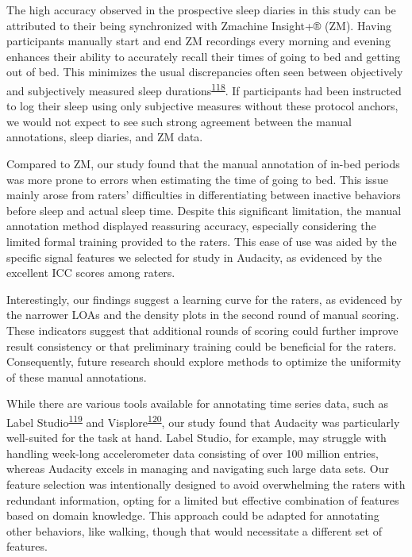 \documentclass[
  10pt,
]{scrbook}
\begin{document}
The high accuracy observed in the prospective sleep diaries in this
study can be attributed to their being synchronized with Zmachine
Insight+® (ZM). Having participants manually start and end ZM recordings
every morning and evening enhances their ability to accurately recall
their times of going to bed and getting out of bed. This minimizes the
usual discrepancies often seen between objectively and subjectively
measured sleep
durations\textsuperscript{\protect\hyperlink{ref-aili_reliability_2017}{118}}.
If participants had been instructed to log their sleep using only
subjective measures without these protocol anchors, we would not expect
to see such strong agreement between the manual annotations, sleep
diaries, and ZM data.

Compared to ZM, our study found that the manual annotation of in-bed
periods was more prone to errors when estimating the time of going to
bed. This issue mainly arose from raters' difficulties in
differentiating between inactive behaviors before sleep and actual sleep
time. Despite this significant limitation, the manual annotation method
displayed reassuring accuracy, especially considering the limited formal
training provided to the raters. This ease of use was aided by the
specific signal features we selected for study in Audacity, as evidenced
by the excellent ICC scores among raters.

Interestingly, our findings suggest a learning curve for the raters, as
evidenced by the narrower LOAs and the density plots in the second round
of manual scoring. These indicators suggest that additional rounds of
scoring could further improve result consistency or that preliminary
training could be beneficial for the raters. Consequently, future
research should explore methods to optimize the uniformity of these
manual annotations.

While there are various tools available for annotating time series data,
such as Label
Studio\textsuperscript{\protect\hyperlink{ref-label_studio}{119}} and
Visplore\textsuperscript{\protect\hyperlink{ref-visplore}{120}}, our
study found that Audacity was particularly well-suited for the task at
hand. Label Studio, for example, may struggle with handling week-long
accelerometer data consisting of over 100 million entries, whereas
Audacity excels in managing and navigating such large data sets. Our
feature selection was intentionally designed to avoid overwhelming the
raters with redundant information, opting for a limited but effective
combination of features based on domain knowledge. This approach could
be adapted for annotating other behaviors, like walking, though that
would necessitate a different set of features.
\end{document}
